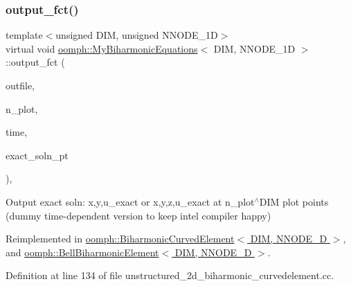 \mbox{\label{classoomph_1_1MyBiharmonicEquations_a95b35b18fac5212ade1a81c26657bcdb}} 
\subsubsection{\texorpdfstring{output\+\_\+fct()}{output\_fct()}\hspace{0.1cm}{\footnotesize\ttfamily [4/4]}}
{\footnotesize\ttfamily template$<$unsigned D\+IM, unsigned N\+N\+O\+D\+E\+\_\+1D$>$ \\
virtual void \hyperlink{classoomph_1_1MyBiharmonicEquations}{oomph\+::\+My\+Biharmonic\+Equations}$<$ D\+IM, N\+N\+O\+D\+E\+\_\+1D $>$\+::output\+\_\+fct (\begin{DoxyParamCaption}\item[{std\+::ostream \&}]{outfile,  }\item[{const unsigned \&}]{n\+\_\+plot,  }\item[{const double \&}]{time,  }\item[{Finite\+Element\+::\+Unsteady\+Exact\+Solution\+Fct\+Pt}]{exact\+\_\+soln\+\_\+pt }\end{DoxyParamCaption})\hspace{0.3cm}{\ttfamily [inline]}, {\ttfamily [virtual]}}



Output exact soln\+: x,y,u\+\_\+exact or x,y,z,u\+\_\+exact at n\+\_\+plot$^\wedge$\+D\+IM plot points (dummy time-\/dependent version to keep intel compiler happy) 



Reimplemented in \hyperlink{classoomph_1_1BiharmonicCurvedElement_a50187fb5a3a0a5905590ed7cd6780211}{oomph\+::\+Biharmonic\+Curved\+Element$<$ D\+I\+M, N\+N\+O\+D\+E\+\_\+D $>$}, and \hyperlink{classoomph_1_1BellBiharmonicElement_a35c7af5c86baeb3787eaf87e2401ea6c}{oomph\+::\+Bell\+Biharmonic\+Element$<$ D\+I\+M, N\+N\+O\+D\+E\+\_\+D $>$}.



Definition at line 134 of file unstructured\+\_\+2d\+\_\+biharmonic\+\_\+curvedelement.\+cc.

\mbox{\label{classoomph_1_1MyBiharmonicEquations_a6898ff065e57f8e765440da81075cf3d}} 
